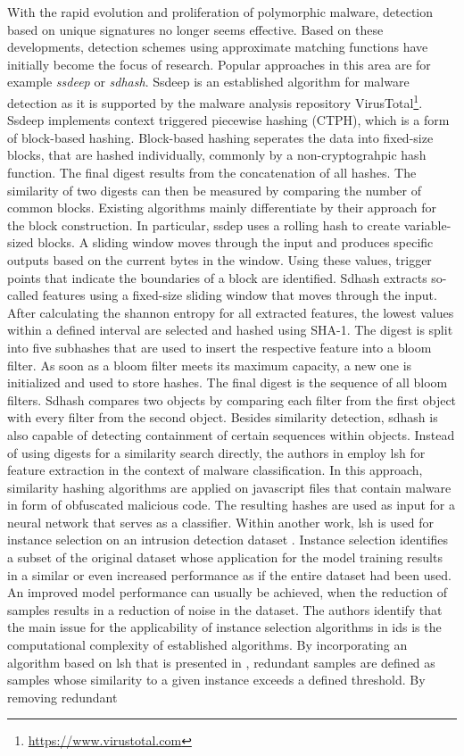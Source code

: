 \documentclass[../../main.tex]{subfiles}
\begin{document}
With the rapid evolution and proliferation of polymorphic malware, detection based on unique signatures no longer seems effective. Based on these developments, detection schemes using approximate matching functions have initially become the focus of research. Popular approaches in this area are for example \textit{ssdeep} or \textit{sdhash}. Ssdeep \cite{kornblum_identifying_2006} is an established algorithm for malware detection as it is supported by the malware analysis repository VirusTotal\footnote{\url{https://www.virustotal.com}}. Ssdeep implements context triggered piecewise hashing (CTPH), which is a form of block-based hashing. Block-based hashing seperates the data into fixed-size blocks, that are hashed individually, commonly by a non-cryptograhpic hash function. The final digest results from the concatenation of all hashes. The similarity of two digests can then be measured by comparing the number of common blocks. Existing algorithms mainly differentiate by their approach for the block construction. In particular, ssdep uses a rolling hash to create variable-sized blocks. A sliding window moves through the input and produces specific outputs based on the current bytes in the window. Using these values, trigger points that indicate the boundaries of a block are identified. Sdhash \cite{chow_data_2010} extracts so-called features using a fixed-size sliding window that moves through the input. After calculating the shannon entropy for all extracted features, the lowest values within a defined interval are selected and hashed using SHA-1. The digest is split into five subhashes that are used to insert the respective feature into a bloom filter. As soon as a bloom filter meets its maximum capacity, a new one is initialized and used to store hashes. The final digest is the sequence of all bloom filters. Sdhash compares two objects by comparing each filter from the first object with every filter from the second object. Besides similarity detection, sdhash is also capable of detecting containment of certain sequences within objects. Instead of using digests for a similarity search directly, the authors in \cite{ludwig_friborg_malware_2019} employ \gls{lsh} for feature extraction in the context of malware classification. In this approach, similarity hashing algorithms are applied on javascript files that contain malware in form of obfuscated malicious code. The resulting hashes are used as input for a neural network that serves as a classifier. Within another work, \gls{lsh} is used for instance selection on an intrusion detection dataset \cite{baldini2021intrusion}. Instance selection identifies a subset of the original dataset whose application for the model training results in a similar or even increased performance as if the entire dataset had been used. An improved model performance can usually be achieved, when the reduction of samples results in a reduction of noise in the dataset. The authors identify that the main issue for the applicability of instance selection algorithms in \gls{ids} is the computational complexity of established algorithms. By incorporating an algorithm based on \gls{lsh} that is presented in \cite{aslani2020fast}, redundant samples are defined as samples whose similarity to a given instance exceeds a defined threshold. By removing redundant 
\end{document}
